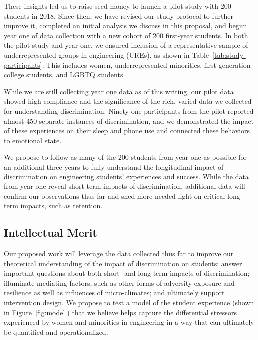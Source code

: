 These insights led us to raise seed money to launch a pilot study with 200 students in 2018. Since then, we have revised our study protocol to further improve it, completed an initial analysis we discuss in this proposal, and begun year one of data collection with a new cohort of 200 first-year students. In both the pilot study and year one, we ensured inclusion of a representative sample of underrepresented groups in engineering (UREs), as shown in Table~\ref{tab:study-participants}. This includes women, underrepresented minorities, first-generation college students, and LGBTQ students. 

While we are still collecting year one data as of this writing, our pilot data showed high compliance and the significance of the rich, varied data we collected for understanding discrimination. Ninety-one participants from the pilot reported almost 450 separate instances of discrimination, and we demonstrated the impact of these experiences on their sleep and phone use and connected these behaviors to emotional state.  

We propose to follow as many of the 200 students from year one as possible for an additional three years to fully understand the longitudinal impact of discrimination on engineering students’ experiences and success. While the data from year one reveal short-term impacts of discrimination, additional data will confirm our observations thus far and shed more needed light on critical long-term impacts, such as retention. 

\subsection{Intellectual Merit}
\label{sec:questions}

Our proposed work will leverage the data collected thus far to improve our theoretical understanding of the impact of discrimination on students; answer important questions about both short- and long-term impacts of discrimination; illuminate mediating factors, such as other forms of adversity exposure and resilience as well as influences of micro-climates; and ultimately support intervention design.  We  propose to test a model of the student experience (shown in Figure~\ref{fig:model}) that we believe helps capture the differential stressors experienced by women and minorities in engineering in a way that can ultimately be quantified and operationalized. 

